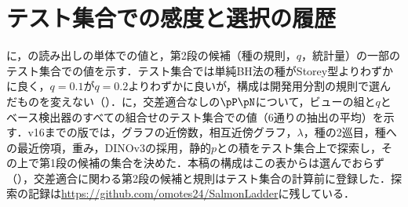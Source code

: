 \begin{table}[t]
\centering
\caption{第1段の候補（ビューと$q$；[\%]，交差適合なしの$\pP\pN$，単体，5通りの抽出の平均）．\textcolor{sotacol}{$\bigstar$}は列の最良値．}
\label{tab:sel}
\vspace{1.5mm}

\end{table}

\begin{table}[t]
\centering
\caption{第2段の候補（交差適合の種の規則・$q$・統計量；[\%]，$\pfin$，単体，5通りの抽出の平均）と参照．\textcolor{sotacol}{$\bigstar$}は列の最良値．}
\label{tab:selq}
\vspace{1.5mm}

\end{table}

\section{テスト集合での感度と選択の履歴}
\label{sec:app_sens}
に，の読み出しの単体での値と，第2段の候補（種の規則，$q$，統計量）の一部のテスト集合での値を示す．テスト集合では単純BH法の種がStorey型よりわずかに良く，$q{=}0.1$が$q{=}0.2$よりわずかに良いが，構成は開発用分割の規則で選んだものを変えない（）．に，交差適合なしの$\pP\pN$について，ビューの組と$q$とベース検出器のすべての組合せのテスト集合での値（6通りの抽出の平均）を示す．v16までの版では，グラフの近傍数，相互近傍グラフ，$\lambda$，種の2巡目，種への最近傍項，重み，DINOv3の採用，静的$p$との積をテスト集合上で探索し，その上で第1段の候補の集合を決めた．本稿の構成はこの表からは選んでおらず（），交差適合に関わる第2段の候補と規則はテスト集合の計算前に登録した．探索の記録は\url{https://github.com/omotes24/SalmonLadder}に残している．

\begin{table}[t]
\centering
\caption{同じ特徴での読み出しの比較（単体）と第2段の他の候補の値（[\%]，6通りの抽出の平均）．記法はと同じ．}
\label{tab:ablx}
\vspace{1.5mm}

\end{table}

\begin{table}[t]
\centering
\caption{テスト集合での感度（[\%]，交差適合なしの$\pP\pN$，6通りの抽出の平均）．\textcolor{sotacol}{$\bigstar$}は列の最良値．}
\label{tab:sens}
\vspace{1.5mm}

\end{table}

